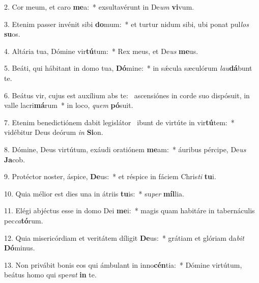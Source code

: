 2. Cor meum, et caro \textbf{me}a:~*  exsultavérunt in De\textit{um} \textbf{vi}vum.\

3. Etenim passer invénit sibi \textbf{do}mum:~*  et turtur nidum sibi, ubi ponat pul\textit{los} \textbf{su}os.\

4. Altária tua, Dómine vir\textbf{tú}tum:~*  Rex meus, et De\textit{us} \textbf{me}us.\

5. Beáti, qui hábitant in domo tua, \textbf{Dó}mine:~*  in sǽcula sæculórum \textit{lau}\textbf{dá}bunt te.\

6. Beátus vir, cujus est auxílium abs te: \dag\  ascensiónes in corde suo dispósuit, in valle lacri\textbf{má}rum~*  in loco, \textit{quem} \textbf{pó}suit.\

7. Etenim benedictiónem dabit legislátor \dag\  ibunt de virtúte in vir\textbf{tú}tem:~*  vidébitur Deus deórum \textit{in} \textbf{Si}on.\

8. Dómine, Deus virtútum, exáudi oratiónem \textbf{me}am:~*  áuribus pércipe, De\textit{us} \textbf{Ja}cob.\

9. Protéctor noster, áspice, \textbf{De}us:~*  et réspice in fáciem Chris\textit{ti} \textbf{tu}i.\

10. Quia mélior est dies una in átriis \textbf{tu}is:~*  su\textit{per} \textbf{míl}lia.\

11. Elégi abjéctus esse in domo Dei \textbf{me}i:~*  magis quam habitáre in tabernáculis pec\textit{ca}\textbf{tó}rum.\

12. Quia misericórdiam et veritátem díligit \textbf{De}us:~*  grátiam et glóriam da\textit{bit} \textbf{Dó}minus.\

13. Non privábit bonis eos qui ámbulant in inno\textbf{cén}tia:~*  Dómine virtútum, beátus homo qui spe\textit{rat} \textbf{in} te.\

